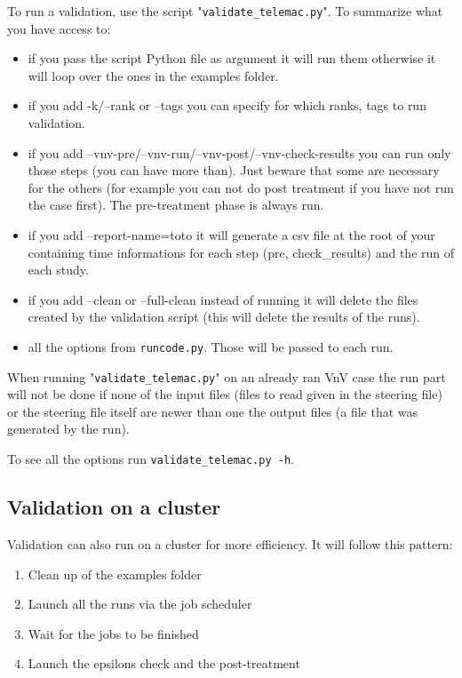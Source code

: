 To run a validation, use the script "\verb!validate_telemac.py!".
To summarize what you have access to:
\begin{itemize}
\item if you pass the script Python file as argument it will run them otherwise
  it will loop over the ones in the examples folder.
\item if you add -k/--rank or --tags you can specify for which ranks, tags to
  run validation.
\item if you add --vnv-pre/--vnv-run/--vnv-post/--vnv-check-results you can run
only those steps (you can have more than). Just beware that some are necessary
for the others (for example you can not do post treatment if you have not run
the case first). The pre-treatment phase is always run.
\item if you add --report-name=toto it will generate a csv file at the root of
  your \telemacsystem{} containing time informations for each step (pre,
    check\_results) and the run of each study.
\item if you add --clean or --full-clean instead of running it will delete the
  files created by the validation script (this will delete the results of the
    runs).
\item all the options from \verb!runcode.py!. Those will be passed to each run.
\end{itemize}

When running "\verb!validate_telemac.py!" on an already ran VnV case the run
part will not be done if none of the input files (files to read given in the
steering file) or the steering file itself are newer than one the output files
(a file that was generated by the run).

To see all the options run \verb!validate_telemac.py -h!.

\subsection{Validation on a cluster}

Validation can also run on a cluster for more efficiency.
It will follow this pattern:
\begin{enumerate}
  \item Clean up of the examples folder
  \item Launch all the \telma runs via the job scheduler
  \item Wait for the jobs to be finished
  \item Launch the epsilons check and the post-treatment
\end{enumerate}

